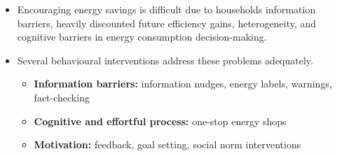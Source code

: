 \documentclass[
  12pt,
  captions=heading]{scrreport}
\begin{document}
\begin{itemize}
\item
  Encouraging energy savings is difficult due to
  households\textquotesingle{} information barriers, heavily discounted
  future efficiency gains, heterogeneity, and cognitive barriers in
  energy consumption decision-making.
\item
  Several behavioural interventions address these problems adequately.

  \begin{itemize}
  \item
    \textbf{Information barriers:} information nudges, energy labels,
    warnings, fact-checking
  \item
    \textbf{Cognitive and effortful process:} one-stop energy shops
  \item
    \textbf{Motivation:} feedback, goal setting, social norm
    interventions
  \end{itemize}
\end{itemize}
\end{document}
